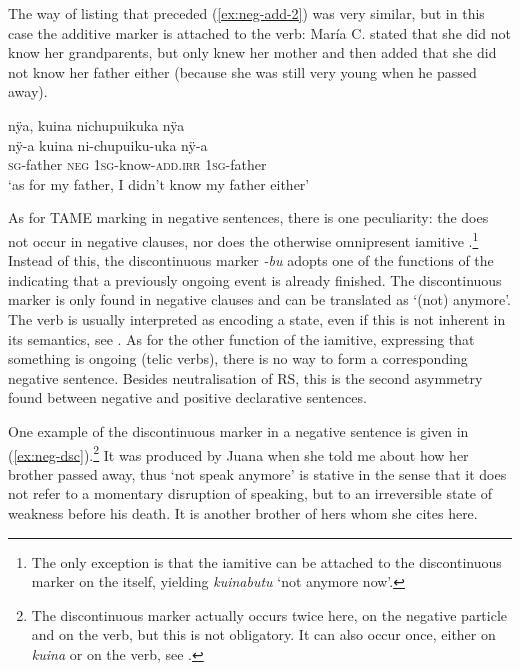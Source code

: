 The way of listing that preceded (\ref{ex:neg-add-2}) was very similar, but in this case the additive marker is attached to the verb: María C. stated that she did not know her grandparents, but only knew her mother and then added that she did not know her father either (because she was still very young when he passed away).

\ea\label{ex:neg-add-2}
\begingl
\glpreamble nÿa, kuina nichupuikuka nÿa\\
\gla  nÿ-a kuina ni-chupuiku-uka nÿ-a\\
\textsc{sg}-father \textsc{neg} 1\textsc{sg}-know-\textsc{add.irr} 1\textsc{sg}-father\\
\glft ‘as for my father, I didn’t know my father either’
\endgl
\trailingcitation{[ump-p110815sf.148]}
\xe


As for TAME marking in negative sentences, there is one peculiarity: the  does not occur in negative clauses, nor does the otherwise omnipresent iamitive .\footnote{The only exception is that the iamitive can be attached to the discontinuous marker on the  itself, yielding \textit{kuinabutu} ‘not anymore now’.} Instead of this, the \isi{}discontinuous marker \textit{-bu} adopts one of the functions of the  indicating that a previously ongoing event is already finished. The discontinuous marker is only found in negative clauses and can be translated as ‘(not) anymore’. The verb is usually interpreted as encoding a state, even if this is not inherent in its semantics, see . As for the other function of the iamitive, expressing that something is ongoing (telic verbs), there is no way to form a corresponding negative sentence. Besides neutralisation of RS, this is the second asymmetry found between negative and positive declarative sentences.

One example of the discontinuous marker in a negative sentence is given in (\ref{ex:neg-dsc}).\footnote{The discontinuous marker actually occurs twice here, on the negative particle and on the verb, but this is not obligatory. It can also occur once, either on \textit{kuina} or on the verb, see .} It was produced by Juana when she told me about how her brother passed away, thus ‘not speak anymore’ is stative in the sense that it does not refer to a momentary disruption of speaking, but to an irreversible state of weakness before his death. It is another brother of hers whom she cites here.

